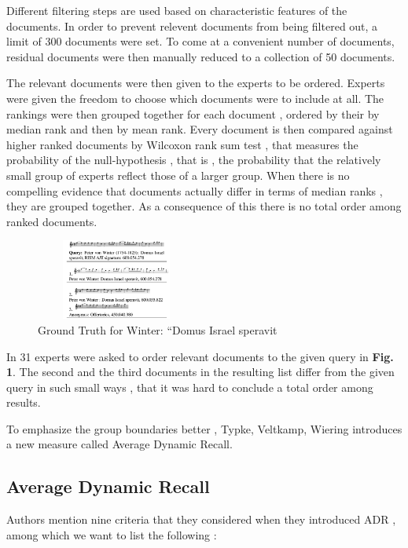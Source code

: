 \documentclass{llncs}
\begin{document}
 		Different filtering steps are used based on characteristic features of the documents. In order to prevent relevent documents from being filtered out, a limit of 300 documents were set. To come at a convenient number of documents, residual documents were then manually reduced to a collection of 50 documents.

 		The relevant documents were then given to the experts to be ordered. Experts were given the freedom to choose which documents were to include at all. The rankings were then grouped together for each document , ordered by their by median rank and then by mean rank. Every document is then compared against higher ranked documents by Wilcoxon rank sum test , that measures the probability of the null-hypothesis , that is , the probability that the relatively small group of experts reflect those of a larger group. When there is no compelling evidence that documents actually differ in terms of median ranks , they are grouped together. As a consequence of this there is no total order among ranked documents. 

 		\begin{figure}[h!]
			\centering
			\includegraphics[width=200px,height=100px,keepaspectratio]{one_of_two_point_four_point_four}
			\caption{Ground Truth for Winter: “Domus Israel speravit \cite{two_point_four_point_four}}
		\end{figure}


 		In \cite{two_point_four_point_four} 31 experts were asked to order relevant documents to the given query in \textbf{Fig. 1}. The second and the third documents in the resulting list differ from the given query in such small ways , that it was hard to conclude a total order among results.

 		To emphasize the group boundaries better , Typke, Veltkamp, Wiering \cite{two_point_four_point_four} introduces a new measure called Average Dynamic Recall. 

		\subsection{Average Dynamic Recall}
			
			
			Authors mention nine criteria that they considered when they introduced ADR , among which we want to list the following :
\end{document}
